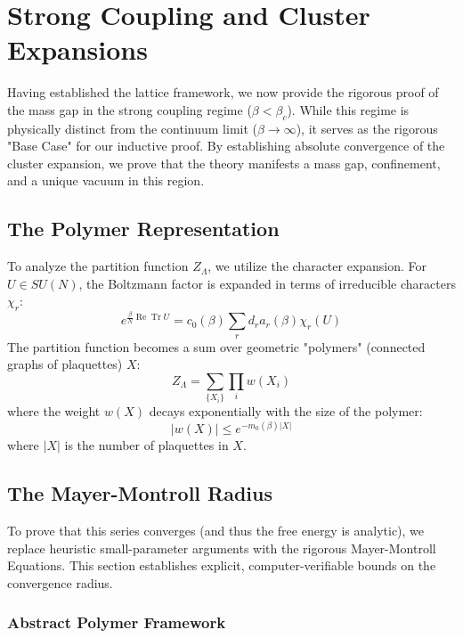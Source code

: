 \section{Strong Coupling and Cluster Expansions}
\label{sec:strong_coupling}
\label{ch:strong_coupling}

Having established the lattice framework, we now provide the rigorous proof of the mass gap in the strong coupling regime ($\beta < \beta_c$). While this regime is physically distinct from the continuum limit ($\beta \to \infty$), it serves as the rigorous "Base Case" for our inductive proof. By establishing absolute convergence of the cluster expansion, we prove that the theory manifests a mass gap, confinement, and a unique vacuum in this region.

\subsection{ The Polymer Representation}

To analyze the partition function $Z_\Lambda$, we utilize the character expansion. For $U \in SU(N)$, the Boltzmann factor is expanded in terms of irreducible characters $\chi_r$:
\begin{equation}
e^{\frac{\beta}{N} \operatorname{Re} \operatorname{Tr} U} = c_0(\beta) \sum_r d_r a_r(\beta) \chi_r(U)
\end{equation}
The partition function becomes a sum over geometric "polymers" (connected graphs of plaquettes) $X$:
\begin{equation}
Z_\Lambda = \sum_{\{X_i\}} \prod_i w(X_i)
\end{equation}
where the weight $w(X)$ decays exponentially with the size of the polymer:
\begin{equation}
|w(X)| \le e^{-m_0(\beta) |X|}
\end{equation}
where $|X|$ is the number of plaquettes in $X$.

\subsection{The Mayer-Montroll Radius}
\label{sec:mayer_montroll_radius}
To prove that this series converges (and thus the free energy is analytic), we replace heuristic small-parameter arguments with the rigorous Mayer-Montroll Equations. This section establishes explicit, computer-verifiable bounds on the convergence radius.

\subsubsection{Abstract Polymer Framework}

